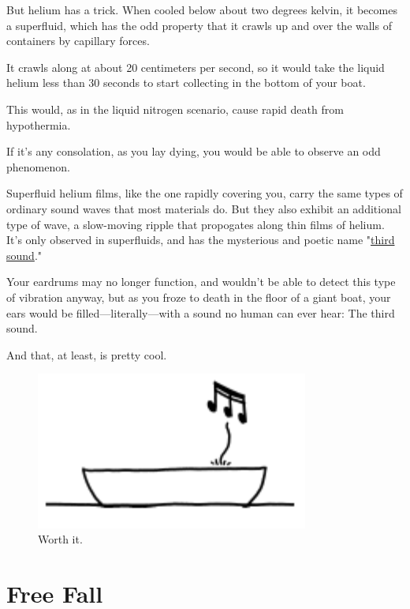 {{But helium has a trick. When cooled below about two degrees kelvin, it becomes a superfluid, which has the odd property that it crawls up and over the walls of containers by capillary forces.}

{It crawls along at about 20 centimeters per second, so it would take the liquid helium less than 30 seconds to start collecting in the bottom of your boat.}

{This would, as in the liquid nitrogen scenario, cause rapid death from hypothermia.}

{If it's any consolation, as you lay dying, you would be able to observe an odd phenomenon.}

{Superfluid helium films, like the one rapidly covering you, carry the same types of ordinary sound waves that most materials do. But they also exhibit an additional type of wave, a slow-moving ripple that propogates along thin films of helium. It's only observed in superfluids, and has the mysterious and poetic name "\href{http://www.physics.berkeley.edu/research/packard/current\_research/schechter's\%20web/page2.html}{third sound}."}

{Your eardrums may no longer function, and wouldn't be able to detect this type of vibration anyway, but as you froze to death in the floor of a giant boat, your ears would be filled—literally—with a sound no human can ever hear: The third sound.}

{And that, at least, is pretty cool.}

\begin{figure}[!htbp]
\centering
\includegraphics[scale=0.5, max width=0.8\textwidth]{imgs/a/50/boat_cool.png}
\caption{Worth it.}
\end{figure}

{
\chapter{Free Fall}
}

}
